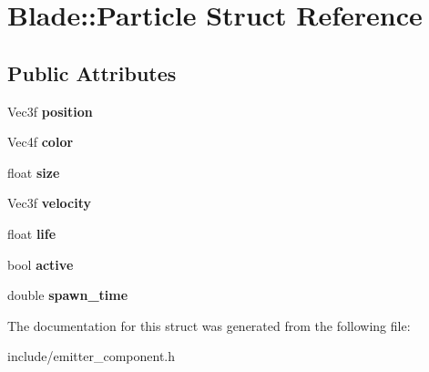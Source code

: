 \hypertarget{struct_blade_1_1_particle}{}\section{Blade\+:\+:Particle Struct Reference}
\label{struct_blade_1_1_particle}
\subsection*{Public Attributes}
\begin{DoxyCompactItemize}
\item 
\mbox{\label{struct_blade_1_1_particle_afea0f54a9dad9779c5fefdfbdc7e9eef}} 
Vec3f {\bfseries position}
\item 
\mbox{\label{struct_blade_1_1_particle_a5200cd799f0aa1b9f372bef2f52b842f}} 
Vec4f {\bfseries color}
\item 
\mbox{\label{struct_blade_1_1_particle_acf56bd264faa35cf0b355858a78944ec}} 
float {\bfseries size}
\item 
\mbox{\label{struct_blade_1_1_particle_a1f7ab4243f2b662167a1717255d29b16}} 
Vec3f {\bfseries velocity}
\item 
\mbox{\label{struct_blade_1_1_particle_a4991a8cd32a403928d3ce0b0fed29ea1}} 
float {\bfseries life}
\item 
\mbox{\label{struct_blade_1_1_particle_a38ba231f0f9fe5305d2de8f9a65c4371}} 
bool {\bfseries active}
\item 
\mbox{\label{struct_blade_1_1_particle_af113ad28652fe7610dbd90d1c8494a75}} 
double {\bfseries spawn\+\_\+time}
\end{DoxyCompactItemize}


The documentation for this struct was generated from the following file\+:\begin{DoxyCompactItemize}
\item 
include/emitter\+\_\+component.\+h\end{DoxyCompactItemize}
